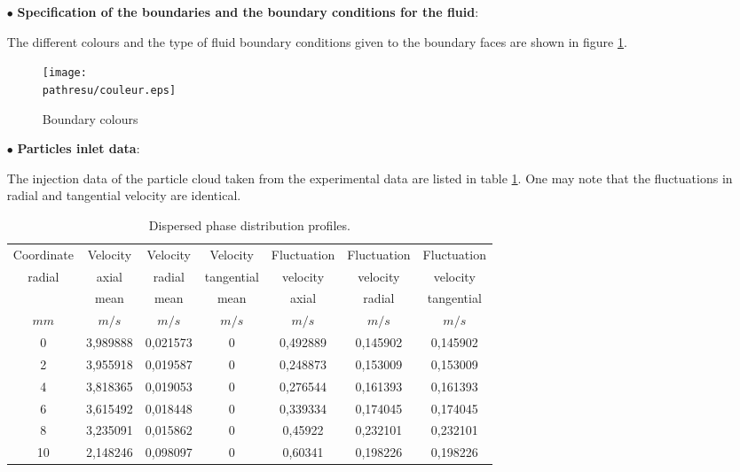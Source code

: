 \documentclass[a4paper,twoside,12pt]{article}
\newcommand{\pathresu}{./FIGURES}
\begin{document}
\begin{itemize}

\item[$\bullet$] \textbf{Specification of the boundaries and the boundary conditions for the fluid}:

The different colours and the type of fluid boundary conditions given to the boundary faces are shown in figure \ref{couleur}.

\begin{figure}[htbp]
   \centerline{\texttt{[image: \\pathresu/couleur.eps]}}
   \caption{\label{couleur}{Boundary colours}}
\end{figure}

\item[$\bullet$] \textbf{Particles inlet data}:

The injection data of the particle cloud taken from the experimental data are listed in table \ref{CL_part}. One may note that the fluctuations in radial and tangential velocity are identical.

\begin{table}[htbp]
   \begin{center}
      \begin{tabular}{|c|c|c|c|c|c|c|} \hline
         Coordinate  & Velocity    & Velocity    & Velocity   &
         Fluctuation & Fluctuation & Fluctuation                                               \\
         radial      & axial       & radial      & tangential & velocity
                     & velocity    & velocity                                                  \\
                     & mean        & mean        & mean       & axial
                     & radial      & tangential                                                \\
         $mm$        & $m/s$       & $m/s$       & $m/s$      & $m/s$    & $m/s$    & $m/s$    \\ \hline
         0           & 3,989888    & 0,021573    & 0          & 0,492889 & 0,145902 & 0,145902 \\ \hline
         2           & 3,955918    & 0,019587    & 0          & 0,248873 & 0,153009 & 0,153009 \\ \hline
         4           & 3,818365    & 0,019053    & 0          & 0,276544 & 0,161393 & 0,161393 \\ \hline
         6           & 3,615492    & 0,018448    & 0          & 0,339334 & 0,174045 & 0,174045 \\ \hline
         8           & 3,235091    & 0,015862    & 0          & 0,45922  & 0,232101 & 0,232101 \\ \hline
         10          & 2,148246    & 0,098097    & 0          & 0,60341  & 0,198226 & 0,198226 \\ \hline
      \end{tabular}
   \end{center}
   \caption{Dispersed phase distribution profiles.}
   \label{CL_part}
\end{table}


\end{itemize}
\end{document}
